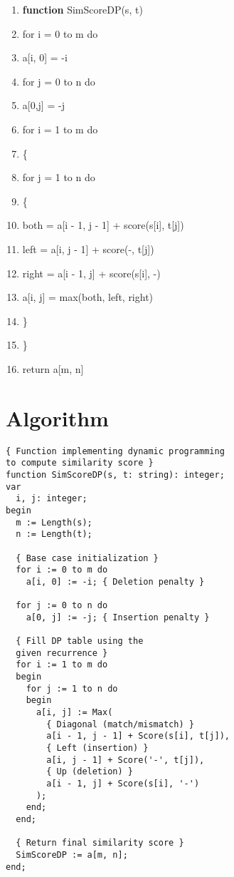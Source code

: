 \documentclass[conference]{IEEEtran}
\begin{document}
\begingroup
\renewcommand\labelenumi{\theenumi:}
\begin{enumerate}
\item \textbf{function} SimScoreDP(s, t)  \label{item:1}
\item for i = 0 to m do \label{item:2}
\item a[i, 0] = -i  \label{item:3}
\item for j = 0 to n do \label{item:4}
\item a[0,j] = -j \label{item:4}
\item for i = 1 to m do \label{item:4}
\item \{ \label{item:4}
\item for j = 1 to n do \label{item:4}
\item \{ \label{item:4}
\item both = a[i - 1, j - 1] + score(s[i], t[j]) \label{item:4}
\item left = a[i, j - 1] + score(-, t[j]) \label{item:4}
\item right = a[i - 1, j] + score(s[i], -) \label{item:4}
\item a[i, j] = max(both, left, right) \label{item:4}
\item \} \label{item:4}
\item \} \label{item:4}
\item return a[m, n] \label{item:4}
\end{enumerate}
\endgroup

\section{Algorithm}
\begin{verbatim}
{ Function implementing dynamic programming 
to compute similarity score }
function SimScoreDP(s, t: string): integer;
var
  i, j: integer;
begin
  m := Length(s);
  n := Length(t);

  { Base case initialization }
  for i := 0 to m do
    a[i, 0] := -i; { Deletion penalty }

  for j := 0 to n do
    a[0, j] := -j; { Insertion penalty }

  { Fill DP table using the 
  given recurrence }
  for i := 1 to m do
  begin
    for j := 1 to n do
    begin
      a[i, j] := Max(
        { Diagonal (match/mismatch) }
        a[i - 1, j - 1] + Score(s[i], t[j]),  
        { Left (insertion) }
        a[i, j - 1] + Score('-', t[j]),     
        { Up (deletion) }
        a[i - 1, j] + Score(s[i], '-')        
      );
    end;
  end;

  { Return final similarity score }
  SimScoreDP := a[m, n];
end;
\end{verbatim}
\end{document}
